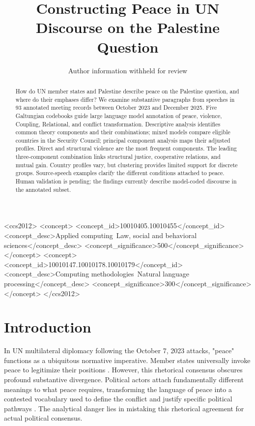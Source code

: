 \documentclass[sigconf,review,anonymous,balance=false]{acmart}
\title{Constructing Peace in UN Discourse on the Palestine Question}
\author{Author information withheld for review}
\begin{document}
\begin{abstract}
How do UN member states and Palestine describe peace on the Palestine question, and where
do their emphases differ? We examine \MainParagraphs{} substantive paragraphs from
\MainSpeeches{} speeches in 93 annotated meeting records between October 2023 and
December 2025. Five Galtungian codebooks guide large language model
annotation of peace, violence, Coupling, Relational, and conflict
transformation. Descriptive analysis identifies common theory components and their
combinations; mixed models compare \EligibleCountries{} eligible countries in the Security
Council; principal component analysis maps their adjusted profiles.
Direct and structural violence are the most frequent components. The leading
three-component combination links structural justice, cooperative relations,
and mutual gain. Country profiles vary, but clustering provides limited
support for discrete groups. Source-speech examples clarify the different
conditions attached to peace. Human validation is pending; the findings
currently describe model-coded discourse in the annotated subset.
\end{abstract}
\begin{CCSXML}
<ccs2012>
<concept>
<concept_id>10010405.10010455</concept_id>
<concept_desc>Applied computing~Law, social and behavioral sciences</concept_desc>
<concept_significance>500</concept_significance>
</concept>
<concept>
<concept_id>10010147.10010178.10010179</concept_id>
<concept_desc>Computing methodologies~Natural language processing</concept_desc>
<concept_significance>300</concept_significance>
</concept>
</ccs2012>
\end{CCSXML}
\maketitle

\section{Introduction}
In UN multilateral diplomacy following the October 7, 2023 attacks, "peace" functions as a ubiquitous normative imperative. Member states universally invoke peace to legitimize their positions \cite{hurd2008after}. However, this rhetorical consensus obscures profound substantive divergence. Political actors attach fundamentally different meanings to what peace requires, transforming the language of peace into a contested vocabulary used to define the conflict and justify specific political pathways \cite{milliken1999study}. The analytical danger lies in mistaking this rhetorical agreement for actual political consensus.
\end{document}
